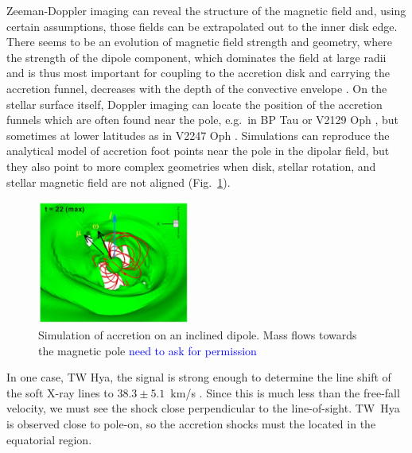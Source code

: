 Zeeman-Doppler imaging can reveal the structure of the magnetic field and, using certain assumptions, those fields can be extrapolated out to the inner disk edge. There seems to be an evolution of magnetic field strength and geometry, where the strength of the dipole component, which dominates the field at large radii and is thus most important for coupling to the accretion disk and carrying the accretion funnel, decreases with the depth of the convective envelope \cite{2012ApJ...755...97G,2019A&A...622A..72V}. On the stellar surface itself, Doppler imaging can locate the position of the accretion funnels which are often found near the pole, e.g.\ in BP Tau \cite{2008MNRAS.386.1234D} or V2129 Oph \cite{2011A&A...530A...1A}, but sometimes at lower latitudes as in V2247 Oph \cite{2010MNRAS.402.1426D}. Simulations can reproduce the analytical model of accretion foot points near the pole in the dipolar field, but they also point to more complex geometries when disk, stellar rotation, and stellar magnetic field are not aligned (Fig.~\ref{fig:romanova}).

\begin{figure}[t]
\centering
\includegraphics[width=5cm]{figs/Romanova2021fig8-panel.png}
\caption{Simulation of accretion on an inclined dipole. Mass flows towards the magnetic pole \cite{2021MNRAS.506..372R} \textcolor{blue}{need to ask for permission} \label{fig:romanova}}
\end{figure}

In one case, TW Hya, the signal is strong enough to determine the line shift of the soft X-ray lines to $38.3 \pm 5.1$~km/s \cite{2017A&A...607A..14A}. Since this is much less than the free-fall velocity, we must see the shock close perpendicular to the line-of-sight. TW~Hya is observed close to pole-on, so the accretion shocks must the located in the equatorial region.




